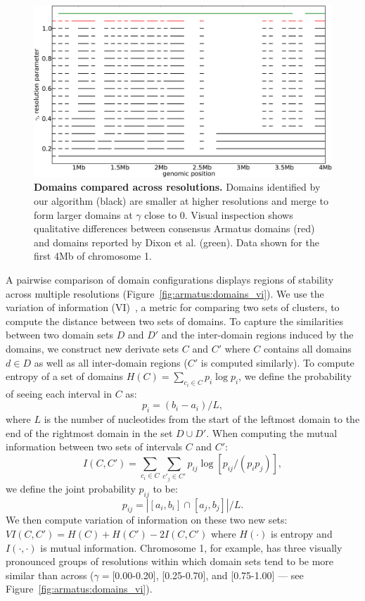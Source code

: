 \documentclass[12pt]{cmuthesis}
\begin{document}
  \begin{figure}[ht]
    \centering
    \includegraphics[width=0.9\linewidth]{figures/domains_long_chr1}
    \caption{\textbf{Domains compared across resolutions.} Domains identified by our algorithm (black) are smaller at higher resolutions and merge to form larger domains at $\gamma$ close to 0. Visual inspection shows qualitative differences between consensus Armatus domains (red) and domains reported by Dixon et al. (green). Data shown for the first 4Mb of chromosome 1.}
    \label{fig:armatus:domains_line_plot}
  \end{figure}


  A pairwise comparison of domain configurations displays regions of stability across multiple resolutions (Figure~\ref{fig:armatus:domains_vi}). We use the variation of information (VI)~\cite{Meila2003}, a metric for comparing two sets of clusters, to compute the distance between two sets of domains. To capture the similarities between two domain sets $D$ and $D'$ and the inter-domain regions induced by the domains, we construct new derivate sets $C$ and $C'$ where $C$ contains all domains $d \in D$ as well as all inter-domain regions ($C'$ is computed similarly). To compute entropy of a set of domains $H(C) = \sum_{c_i  \in C} p_i \log p_i$, we define the probability of seeing each interval in $C$ as:
  \[
    p_i = (b_i - a_i) / L,
  \]
  where $L$ is the number of nucleotides from the start of the leftmost domain to the end of the rightmost domain in the set $D \cup D'$. When computing the mutual information between two sets of intervals $C$ and $C'$:
  \[
    I(C, C') = \sum_{c_i \in C} \sum_{c'_j \in C'} p_{ij} \log[ p_{ij} / (p_i p_j) ],
  \]
  we define the joint probability $p_{ij}$ to be:
  \[
    p_{ij} = | [a_i, b_i] \cap [a_j, b_j] | / L.
  \]
  We then compute variation of information on these two new sets: $VI(C, C') =  H(C) + H(C') - 2I(C, C')$ where $H(\cdot)$ is entropy and $I(\cdot, \cdot)$ is mutual information. Chromosome 1, for example, has three visually pronounced groups of resolutions within which domain sets tend to be more similar than across ($\gamma = $[0.00-0.20], [0.25-0.70], and [0.75-1.00] --- see Figure~\ref{fig:armatus:domains_vi}).
\end{document}
